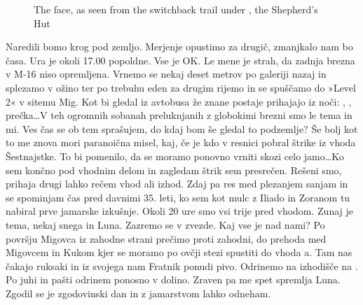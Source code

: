 \begin{figure}[t!]
\checkoddpage \ifoddpage \forcerectofloat \else \forceversofloat \fi
\centering
{}
\caption{The \protect{} face, as seen from the switchback trail under \protect{}, the Shepherd's Hut }
\label{migovec south face}
\end{figure}

Naredili bomo krog pod zemljo. Merjenje opustimo za drugič, zmanjkalo nam bo časa. Ura je okoli 17.00 popoldne. Vse je OK. Le mene je strah, da zadnja brezna v M-16 niso opremljena. Vrnemo se nekaj deset metrov po galeriji nazaj in splezamo v ožino ter po trebuhu eden za drugim rijemo in se spuščamo do »Level 2« v sitemu Mig. Kot bi gledal iz avtobusa že znane postaje prihajajo iz noči: , ,  prečka…V teh ogromnih sobanah preluknjanih z globokimi brezni smo le tema in mi. Ves čas se ob tem sprašujem, do kdaj bom še gledal to podzemlje? Še bolj kot to me znova mori paranoična misel, kaj, če je kdo v resnici pobral štrike iz vhoda Šestnajstke. To bi pomenilo, da se moramo ponovno vrniti skozi celo jamo…Ko sem končno pod vhodnim delom in zagledam štrik sem presrečen. Rešeni smo, prihaja drugi lahko rečem vhod ali izhod. Zdaj pa res med plezanjem sanjam in se spominjam čas pred davnimi 35. leti, ko sem kot mulc z Iliado in Zoranom tu nabiral prve jamarske izkušnje. Okoli 20 ure smo vsi trije pred vhodom. Zunaj je tema, nekaj snega in Luna. Zazremo se v zvezde. Kaj vse je nad nami? Po površju Migovca iz zahodne strani prečimo proti zahodni, do prehoda med Migovcem in Kukom kjer se moramo po ovčji stezi spustiti do vhoda a. Tam nas čakajo ruksaki in iz svojega nam Fratnik ponudi pivo. Odrinemo na izhodišče na . Po juhi in pašti odrinem ponosno v dolino. Zraven pa me spet spremlja Luna. Zgodil se je zgodovinski dan in z jamarstvom lahko odneham.  
 
